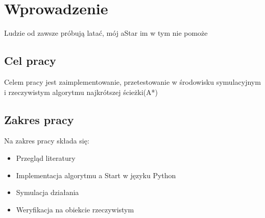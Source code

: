 \section{Wprowadzenie }
Ludzie od zawsze próbują latać, mój aStar im w tym nie pomoże 
\subsection{Cel pracy}
Celem pracy jest zaimplementowanie, przetestowanie w środowisku symulacyjnym i rzeczywistym algorytmu najkrótszej ścieżki(A*)
\subsection{Zakres pracy}
Na zakres pracy składa się:
\begin{itemize}
    \item Przegląd literatury
    \item Implementacja algorytmu a Start w języku Python
    \item Symulacja działania
    \item Weryfikacja na obiekcie rzeczywistym
\end{itemize}